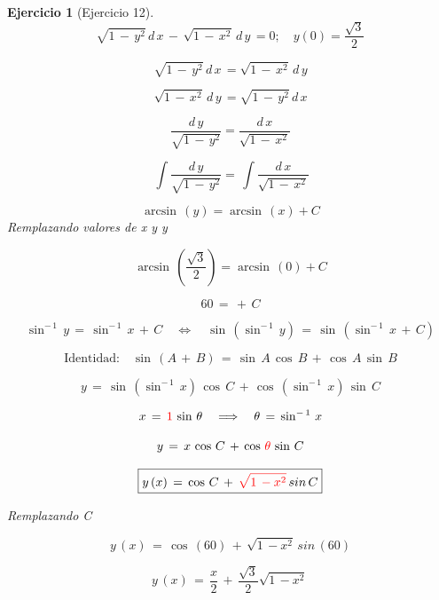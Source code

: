 \documentclass[a4paper,11pt,openany]{book}
\newtheorem{ejer}{Ejercicio}[section]
\begin{document}
\begin{ejer}[Ejercicio 12] 

  $$\sqrt{1\,-\,y^{2}}\,d\,x\,-\,\sqrt{1\,-\,x^{2}}\,d\,y\,= 0; \quad y(0)=\dfrac{\sqrt{3}}{2}  $$  
 
 $$\sqrt{1\,-\,y^{2}}\,d\,x\,= \sqrt{1\,-\,x^{2}}\,d\,y $$
 
 $$\sqrt{1\,-\,x^{2}}\,d\,y\,= \sqrt{1\,-\,y^{2}}\,d\,x $$
 
 $$ \dfrac{d\,y}{\sqrt{1\,-\,y^{2}}} = \dfrac{d\,x}{\sqrt{1\,-\,x^{2}}} $$
 
   $$\displaystyle\,\int \dfrac{d\,y}{\sqrt{1\,-\,y^{2}}} = \displaystyle\,\int \dfrac{d\,x}{\sqrt{1\,-\,x^{2}}} $$

   $$ \arcsin\,(y) = \arcsin\,(x) + C$$
 Remplazando valores de x y y
 
 $$ \arcsin\,(\dfrac{\sqrt{3}}{2}) = \arcsin\,(0) + C$$

 $$ 60\,=\,+\,C$$

$$\sin^{-\,1}\,y\,=\,\sin^{-\,1}\,x\,+\,C \quad \iff \quad \sin\,(\sin^{-\,1}\,y)\,=\,\sin\,(\sin^{-\,1}\,x\,+\,C)$$

$$\text{Identidad:} \quad \sin\,(A\,+\,B)\,=\,\sin\,A\,\cos\,B\,+\,\cos\,A\,\sin\,B$$

$$y\,=\,\sin\,(\sin^{-\,1}\,x)\,\cos\,C\,+\,\cos\,(\sin^{-\,1}\,x)\,\sin\,C$$

 $$x\,=\,\textcolor{red}{1}\,\sin\,\theta \quad \Longrightarrow \quad \theta\,=\,\sin^{-\,1}\,x$$

$$y\,=\,x\,\cos\,C\,+\,\cos\,\textcolor{red}{\theta}\,\sin\,C$$

$$ \boxed{y\,(x)\,=\,\cos\,C\,+\,\textcolor{red}{\sqrt{1\,-x^{2}}}\,sin\,C} $$

Remplazando C

$$ y\,(x)\,=\,\cos\,(60)\,+\,\sqrt{1\,-x^{2}}\,sin\,(60) $$

$$ \boxed{y\,(x)\,=\,\dfrac{x}{2}\,+\, \dfrac{\sqrt{3}}{2} \sqrt{1\,-x^{2}}\, }$$

\end{ejer} 
\end{document}
